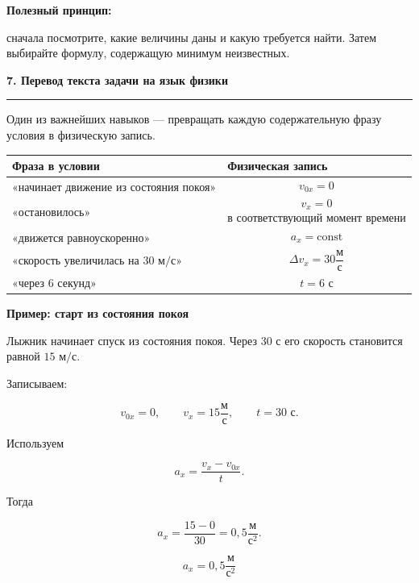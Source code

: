 \documentclass[a4paper,12pt]{article}
\newcommand{\sectiontitle}[1]{%
  \vspace{2mm}
  {\Large\bfseries\color{darkaccent}#1}\par
  \vspace{1mm}
  {\color{accent}\rule{\linewidth}{0.5pt}}
  \vspace{3mm}
}
\newcommand{\subsectiontitle}[1]{%
  \vspace{2mm}
  {\large\bfseries\color{darkaccent}#1}\par
  \vspace{1mm}
}
\newcommand{\important}[1]{%
  {\bfseries\color{darkaccent}#1}
}
\begin{document}
\important{Полезный принцип:}
сначала посмотрите, какие величины даны и какую требуется найти. Затем выбирайте формулу, содержащую минимум неизвестных.

\clearpage



\sectiontitle{7. Перевод текста задачи на язык физики}

Один из важнейших навыков --- превращать каждую содержательную фразу условия в физическую запись.

\begin{center}
\begin{tabularx}{\linewidth}{@{}X X@{}}
\toprule
\textbf{Фраза в условии} & \textbf{Физическая запись} \\
\midrule

«начинает движение из состояния покоя»
&
\[
v_{0x}=0
\]
\\

«остановилось»
&
\[
v_x=0
\]
в соответствующий момент времени
\\

«движется равноускоренно»
&
\[
a_x=\text{const}
\]
\\

«скорость увеличилась на \(30\text{ м/с}\)»
&
\[
\Delta v_x=30\frac{\text{м}}{\text{с}}
\]
\\

«через \(6\) секунд»
&
\[
t=6\text{ с}
\]
\\

\bottomrule
\end{tabularx}
\end{center}

\subsectiontitle{Пример: старт из состояния покоя}

Лыжник начинает спуск из состояния покоя. Через \(30\) с его скорость становится равной \(15\text{ м/с}\).

Записываем:

\[
v_{0x}=0,
\qquad
v_x=15\frac{\text{м}}{\text{с}},
\qquad
t=30\text{ с}.
\]

Используем

\[
a_x=\frac{v_x-v_{0x}}{t}.
\]

Тогда

\[
a_x=
\frac{15-0}{30}
=
0{,}5\frac{\text{м}}{\text{с}^2}.
\]

\[
\boxed{
a_x=0{,}5\frac{\text{м}}{\text{с}^2}
}
\]
\end{document}

